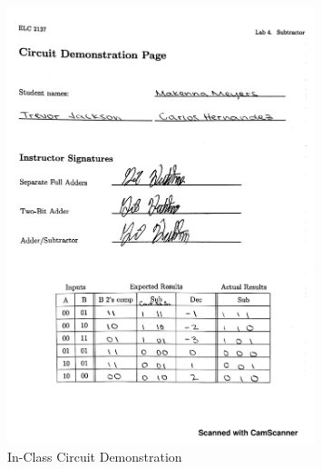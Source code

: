 \documentclass[11pt]{article}
\begin{document}
\begin{figure}\centering
	\includegraphics[width=0.8\textwidth,trim=0cm 3cm 0cm 0cm,clip]{Lab4_Circuit_Demonstration_Page} 
	\caption{In-Class Circuit Demonstration}
	\label{fig:Circuit_Demonstration}
\end{figure}	
\end{document}
